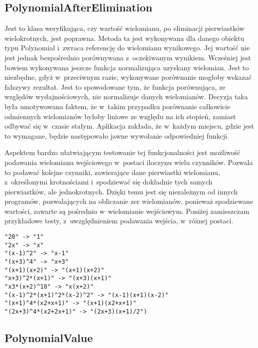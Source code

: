 \subsection{PolynomialAfterElimination}

Jest to klasa weryfikująca, czy wartość wielomianu, po eliminacji pierwiastków wielokrotnych, jest poprawna. Metoda ta jest wykonywana dla danego obiektu typu Polynomial i~zwraca referencję do wielomianu wynikowego. Jej wartość nie jest jednak bezpośrednio porównywana z~oczekiwanym wynikiem. Wcześniej jest bowiem wykonywana jeszcze funkcja normalizująca uzyskany wielomian. Jest to niezbędne, gdyż w~przeciwnym razie, wykonywane porównanie mogłoby wskazać fałszywy rezultat. Jest to spowodowane tym, że funkcja porównująca, ze względów wydajnościowych, nie normalizuje danych wielomianów. Decyzja taka była umotywowana faktem, że w~takim przypadku porównanie całkowicie odmiennych wielomianów byłoby liniowe ze względu na ich stopień, zamiast odbywać się w~czasie stałym. Aplikacja zakłada, że w~każdym miejscu, gdzie jest to wymagane, będzie następowało jawne wywołanie odpowiedniej funkcji.

Aspektem bardzo ułatwiającym testowanie tej funkcjonalności jest możliwość podawania wielomianu wejściowego w~postaci iloczynu wielu czynników. Pozwala to podawać kolejne czynniki, zawierające dane pierwiastki wielomianu, z~określonymi krotnościami i~spodziewać się dokładnie tych samych pierwiastków, ale jednokrotnych. Dzięki temu jest się niezależnym od innych programów, pozwalających na obliczanie zer wielomianów, ponieważ spodziewane wartości, zawarte są pośrednio w~wielomianie wejściowym. Poniżej zamieszczam przykładowe testy, z~uwzględnieniem podawania wejścia, w~różnej postaci.

\begin{lstlisting}
"20" -> "1"
"2x" -> "x"
"(x-1)^2" -> "x-1"
"(x+3)^4" -> "x+3"
"(x+1)(x+2)" -> "(x+1)(x+2)"
"x+3)^2*(x+1)" -> "(x+3)(x+1)"
"x3*(x+2)^10" -> "x(x+2)"
"(x-1)^2*(x+1)^2*(x-2)^2" -> "(x-1)(x+1)(x-2)"
"(x+1)^4*(x2+x+1)" -> "(x+1)(x2+x+1)"
"(2x+3)^4*(x2+2x+1)" -> "(2x+3)(x+1)/2")
\end{lstlisting}

\subsection{PolynomialValue}

